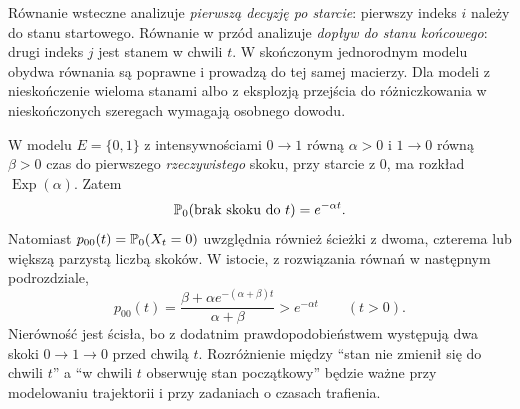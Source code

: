 \begin{uwaga}
Równanie wsteczne analizuje \emph{pierwszą decyzję po starcie}:
pierwszy indeks $i$ należy do stanu startowego.
Równanie w przód analizuje \emph{dopływ do stanu końcowego}:
drugi indeks $j$ jest stanem w chwili $t$.
W skończonym jednorodnym modelu obydwa równania są poprawne
i prowadzą do tej samej macierzy. Dla modeli z nieskończenie
wieloma stanami albo z eksplozją przejścia do różniczkowania
w nieskończonych szeregach wymagają osobnego dowodu.
\end{uwaga}


\begin{przyklad}
W modelu $E=\{0,1\}$ z intensywnościami
$0\to1$ równą $\alpha>0$ i $1\to0$ równą $\beta>0$
czas do pierwszego \emph{rzeczywistego} skoku, przy starcie
z $0$, ma rozkład $\operatorname{Exp}(\alpha)$. Zatem
\[
\mathbb{P}_0(\text{brak skoku do }t)=e^{-\alpha t}.
\]
Natomiast $p_{00}(t)=\mathbb{P}_0(X_t=0)$ uwzględnia również
ścieżki z dwoma, czterema lub większą parzystą liczbą skoków.
W istocie, z rozwiązania równań w następnym podrozdziale,
\[
 p_{00}(t)=\frac{\beta+\alpha e^{-(\alpha+\beta)t}}
 {\alpha+\beta}>e^{-\alpha t}\qquad(t>0).
\]
Nierówność jest ścisła, bo z dodatnim prawdopodobieństwem
występują dwa skoki $0\to1\to0$ przed chwilą $t$.
Rozróżnienie między ``stan nie zmienił się do chwili $t$''
a ``w chwili $t$ obserwuję stan początkowy'' będzie ważne
przy modelowaniu trajektorii i przy zadaniach o czasach trafienia.
\end{przyklad}

